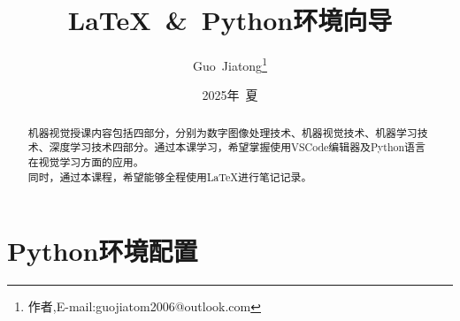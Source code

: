\documentclass{article}
\title{\LaTeX\ \&\ Python环境向导}
\author{Guo\ Jiatong\thanks{作者,E-mail:guojiatom2006@outlook.com}}
\date{2025年\ 夏}
\begin{document}
	\maketitle
	
	\begin{abstract}
		机器视觉授课内容包括四部分，分别为数字图像处理技术、机器视觉技术、机器学习技术、深度学习技术四部分。通过本课学习，希望掌握使用VSCode编辑器及Python语言在视觉学习方面的应用。\\
		同时，通过本课程，希望能够全程使用\LaTeX 进行笔记记录。
	\end{abstract}
	
	\tableofcontents
	\newpage
	
	\section{Python环境配置}
\end{document}

